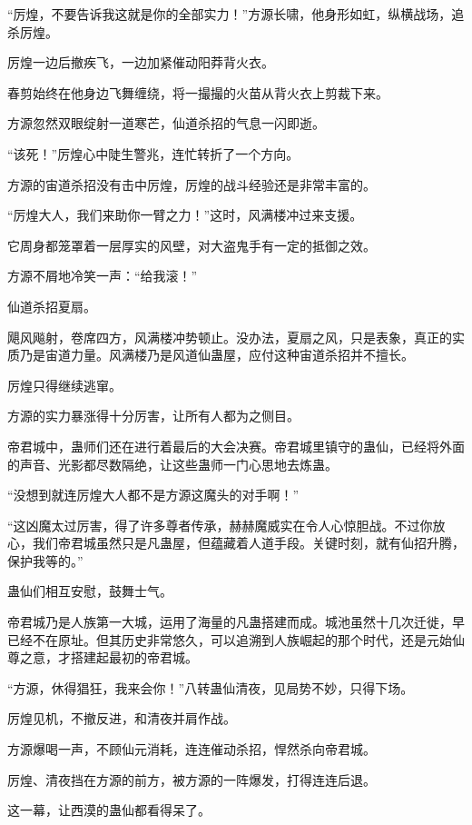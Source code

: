 
\begin{this_body}

“厉煌，不要告诉我这就是你的全部实力！”方源长啸，他身形如虹，纵横战场，追杀厉煌。

厉煌一边后撤疾飞，一边加紧催动阳莽背火衣。

春剪始终在他身边飞舞缠绕，将一撮撮的火苗从背火衣上剪裁下来。

方源忽然双眼绽射一道寒芒，仙道杀招的气息一闪即逝。

“该死！”厉煌心中陡生警兆，连忙转折了一个方向。

方源的宙道杀招没有击中厉煌，厉煌的战斗经验还是非常丰富的。

“厉煌大人，我们来助你一臂之力！”这时，风满楼冲过来支援。

它周身都笼罩着一层厚实的风壁，对大盗鬼手有一定的抵御之效。

方源不屑地冷笑一声：“给我滚！”

仙道杀招夏扇。

飓风飚射，卷席四方，风满楼冲势顿止。没办法，夏扇之风，只是表象，真正的实质乃是宙道力量。风满楼乃是风道仙蛊屋，应付这种宙道杀招并不擅长。

厉煌只得继续逃窜。

方源的实力暴涨得十分厉害，让所有人都为之侧目。

帝君城中，蛊师们还在进行着最后的大会决赛。帝君城里镇守的蛊仙，已经将外面的声音、光影都尽数隔绝，让这些蛊师一门心思地去炼蛊。

“没想到就连厉煌大人都不是方源这魔头的对手啊！”

“这凶魔太过厉害，得了许多尊者传承，赫赫魔威实在令人心惊胆战。不过你放心，我们帝君城虽然只是凡蛊屋，但蕴藏着人道手段。关键时刻，就有仙招升腾，保护我等的。”

蛊仙们相互安慰，鼓舞士气。

帝君城乃是人族第一大城，运用了海量的凡蛊搭建而成。城池虽然十几次迁徙，早已经不在原址。但其历史非常悠久，可以追溯到人族崛起的那个时代，还是元始仙尊之意，才搭建起最初的帝君城。

“方源，休得猖狂，我来会你！”八转蛊仙清夜，见局势不妙，只得下场。

厉煌见机，不撤反进，和清夜并肩作战。

方源爆喝一声，不顾仙元消耗，连连催动杀招，悍然杀向帝君城。

厉煌、清夜挡在方源的前方，被方源的一阵爆发，打得连连后退。

这一幕，让西漠的蛊仙都看得呆了。


\end{this_body}
